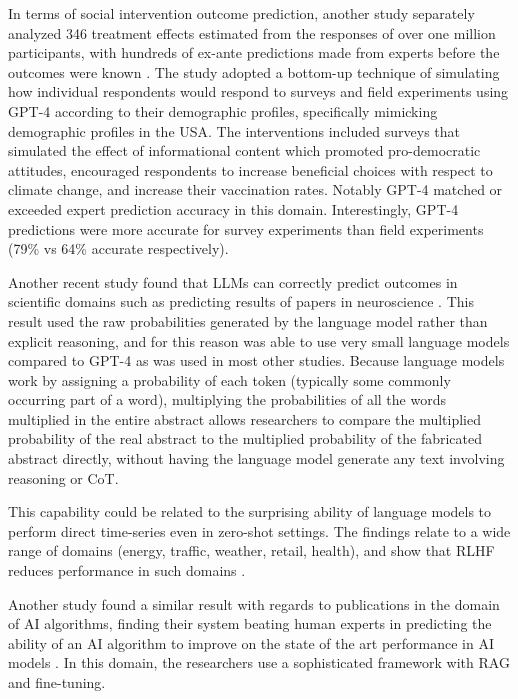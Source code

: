 \documentclass[12pt,a4paper]{article}
\begin{document}
In terms of social intervention outcome prediction, another study separately analyzed 346 treatment effects estimated from the responses of over one million participants, with hundreds of ex-ante predictions made from experts before the outcomes were known . The study adopted a bottom-up technique of simulating how individual respondents would respond to surveys and field experiments using GPT-4 according to their demographic profiles, specifically mimicking demographic profiles in the USA. The interventions included surveys that simulated the effect of informational content which promoted pro-democratic attitudes, encouraged respondents to increase beneficial choices with respect to climate change, and increase their vaccination rates. Notably GPT-4 matched or exceeded expert prediction accuracy in this domain. Interestingly, GPT-4 predictions were more accurate for survey experiments than field experiments (79\% vs 64\% accurate respectively). 

Another recent study found that LLMs can correctly predict outcomes in scientific domains such as predicting results of papers in neuroscience . This result used the raw probabilities generated by the language model rather than explicit reasoning, and for this reason was able to use very small language models compared to GPT-4 as was used in most other studies. Because language models work by assigning a probability of each token (typically some commonly occurring part of a word),  multiplying the probabilities of all the words multiplied in the entire abstract allows researchers to compare the multiplied probability of the real abstract to the multiplied probability of the fabricated abstract directly, without having the language model generate any text involving reasoning or CoT. 

This capability could be related to the surprising ability of language models to perform direct time-series even in zero-shot settings. The findings relate to a wide range of domains (energy, traffic, weather, retail, health), and show that RLHF reduces performance in such domains .

Another study found a similar result with regards to publications in the domain of AI algorithms, finding their system beating human experts in predicting the ability of an AI algorithm to improve on the state of the art performance in AI models . In this domain, the researchers use a sophisticated framework with RAG and fine-tuning.
\end{document}
